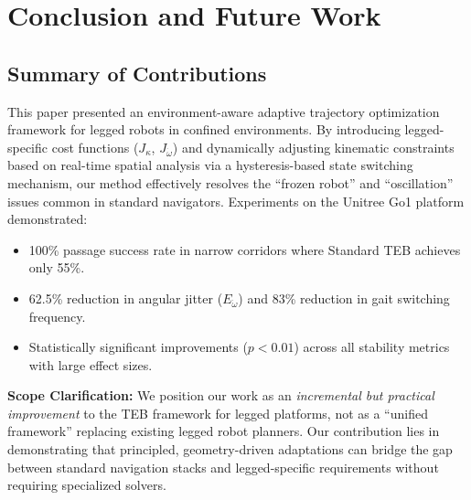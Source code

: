 \documentclass[lettersize,journal]{IEEEtran}
\begin{document}
\section{Conclusion and Future Work}

\subsection{Summary of Contributions}
This paper presented an environment-aware adaptive trajectory optimization framework for legged robots in confined environments. By introducing legged-specific cost functions ($J_{\kappa}$, $J_{\dot{\omega}}$) and dynamically adjusting kinematic constraints based on real-time spatial analysis via a hysteresis-based state switching mechanism, our method effectively resolves the ``frozen robot'' and ``oscillation'' issues common in standard navigators. Experiments on the Unitree Go1 platform demonstrated:
\begin{itemize}
\item 100\% passage success rate in narrow corridors where Standard TEB achieves only 55\%.
\item 62.5\% reduction in angular jitter ($E_{\dot{\omega}}$) and 83\% reduction in gait switching frequency.
\item Statistically significant improvements ($p < 0.01$) across all stability metrics with large effect sizes.
\end{itemize}

\textbf{Scope Clarification:} We position our work as an \textit{incremental but practical improvement} to the TEB framework for legged platforms, not as a ``unified framework'' replacing existing legged robot planners. Our contribution lies in demonstrating that principled, geometry-driven adaptations can bridge the gap between standard navigation stacks and legged-specific requirements without requiring specialized solvers.
\end{document}
